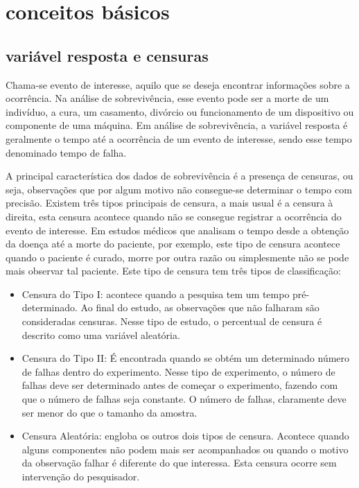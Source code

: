 \documentclass[12pt,a4paper]{article}
\author{Daniel Lima Viegas}
\begin{document}
\section{conceitos básicos}

\subsection{variável resposta e censuras}
Chama-se evento de interesse, aquilo que se deseja encontrar informações sobre a ocorrência. Na análise de sobrevivência, esse evento pode ser a morte de um indivíduo, a cura, um casamento, divórcio ou funcionamento de um dispositivo ou componente de uma máquina. Em análise de sobrevivência, a variável resposta é geralmente o tempo até a ocorrência de um evento de interesse, sendo esse tempo denominado tempo de falha.%

A principal característica dos dados de sobrevivência é a presença de censuras, ou seja, observações que por algum motivo não consegue-se determinar o tempo com precisão. Existem três tipos principais de censura, a mais usual é a censura à direita, esta censura acontece quando não se consegue registrar a ocorrência do evento de interesse. Em estudos médicos que analisam o tempo desde a obtenção da doença até a morte do paciente, por exemplo, este tipo de censura acontece quando o paciente é curado, morre por outra razão ou simplesmente não se pode mais observar tal paciente. Este tipo de censura tem três tipos de classificação:

\begin{itemize}
	\item Censura do Tipo I: acontece quando a pesquisa tem um tempo pré-determinado. Ao final do estudo, as observações que não falharam são consideradas censuras. Nesse tipo de estudo, o percentual de censura é descrito como uma variável aleatória.
	
	\item Censura do Tipo II: É encontrada quando se obtém um determinado número de falhas dentro do experimento. Nesse tipo de experimento, o número de falhas deve ser determinado antes de começar o experimento, fazendo com que o número de falhas seja constante. O número de falhas, claramente deve ser menor do que o tamanho da amostra.
	
	\item Censura Aleatória: engloba os outros dois tipos de censura. Acontece quando alguns componentes não podem mais ser acompanhados ou quando o motivo da observação falhar é diferente do que interessa. Esta censura ocorre sem intervenção do pesquisador.

\end{itemize}
\end{document}
